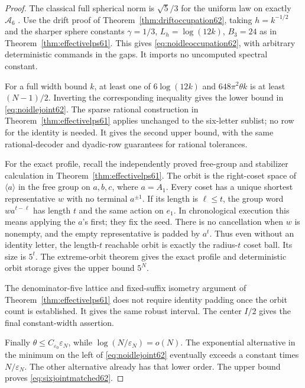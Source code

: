 \begin{proof}
The classical full spherical norm is $\sqrt5/3$ for the uniform law on
exactly $\mathcal A_6$ \cite[Theorem~1.1]{PLP61pre}. Use the drift proof
of Theorem~\ref{thm:driftoccupation62}, taking $h=k^{-1/2}$ and the
sharper sphere constants $\gamma=1/3$, $L_h=\log(12k)$, $B_3=24$
as in Theorem~\ref{thm:effectivelps61}. This gives
\eqref{eq:noidleoccupation62}, with arbitrary deterministic commands
in the gaps. It imports no uncomputed spectral constant.

For a full width bound $k$, at least one of
$6\log(12k)$ and $648\pi^2\theta k$ is at least $(N-1)/2$.
Inverting the corresponding inequality gives the lower bound in
\eqref{eq:noidlejoint62}. The sparse rational construction in
Theorem~\ref{thm:effectivelps61} applies unchanged to the six-letter
sublist; no row for the identity is needed. It gives the second upper
bound, with the same rational-decoder and dyadic-row guarantees for
rational tolerances.

For the exact profile, recall the independently proved free-group and
stabilizer calculation in Theorem~\ref{thm:effectivelps61}. The orbit is
the right-coset space of $\langle a\rangle$ in the free group on $a,b,c$,
where $a=A_1$. Every coset has a unique shortest representative $w$
with no terminal $a^{\pm1}$. If its length is $\ell\le t$, the group
word $w a^{t-\ell}$ has length $t$ and the same action on $e_1$.
In chronological execution this means applying the $a$'s first; they
fix the seed. There is no cancellation when $w$ is nonempty, and the
empty representative is padded by $a^t$. Thus even without an identity
letter, the length-$t$ reachable orbit is exactly the radius-$t$ coset
ball. Its size is $5^t$. The extreme-orbit theorem gives the exact
profile and deterministic orbit storage gives the upper bound $5^N$.

The denominator-five lattice and fixed-suffix isometry argument of
Theorem~\ref{thm:effectivelps61} does not require identity padding once
the orbit count is established. It gives the same robust interval.
The center $I/2$ gives the final constant-width assertion.

Finally $\theta\le C_{\varepsilon_0}\varepsilon_N$, while
$\log(N/\varepsilon_N)=o(N)$. The exponential alternative in the
minimum on the left of \eqref{eq:noidlejoint62} eventually exceeds a
constant times $N/\varepsilon_N$. The other alternative already has
that lower order. The upper bound proves \eqref{eq:sixjointmatched62}.
\end{proof}

